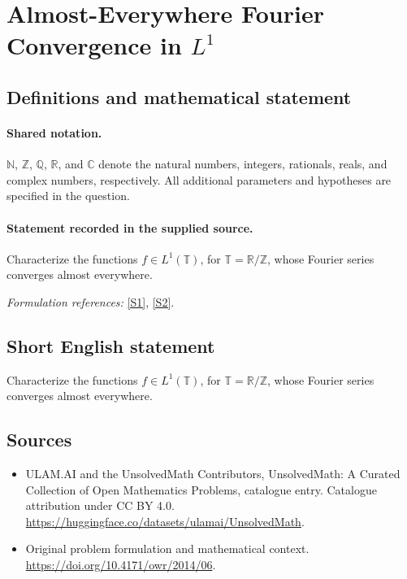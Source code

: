 \documentclass[11pt]{article}
\newcommand{\sref}[2]{\hyperlink{source:#1:#2}{[S#2]}}
\begin{document}
\section{\texorpdfstring{Almost-Everywhere Fourier Convergence in $L^{1}$}{Almost-Everywhere Fourier Convergence in L\textasciicircum{}1}}\label{statement}

\subsection{Definitions and mathematical statement}

\paragraph{Shared notation.}$\mathbb N$, $\mathbb Z$, $\mathbb Q$, $\mathbb R$, and $\mathbb C$ denote the natural numbers, integers, rationals, reals, and complex numbers, respectively. All additional parameters and hypotheses are specified in the question.


\paragraph{Statement recorded in the supplied source.}
Characterize the functions $f\in L^1(\mathbb T)$, for $\mathbb T=\mathbb R/\mathbb Z$, whose Fourier series converges almost everywhere.
\par\smallskip\textit{Formulation references:} \sref{statement}{1}, \sref{statement}{2}.
\subsection{Short English statement}
Characterize the functions $f\in L^1(\mathbb T)$, for $\mathbb T=\mathbb R/\mathbb Z$, whose Fourier series converges almost everywhere.
\subsection{Sources}
\begin{itemize}
\item[\hypertarget{source:statement:1}{S1}] ULAM.AI and the UnsolvedMath Contributors, UnsolvedMath: A Curated Collection of Open Mathematics Problems, catalogue entry. Catalogue attribution under CC BY 4.0.
\url{https://huggingface.co/datasets/ulamai/UnsolvedMath}.
\item[\hypertarget{source:statement:2}{S2}] Original problem formulation and mathematical context.
\url{https://doi.org/10.4171/owr/2014/06}.
\end{itemize}
\label{end:statement}
\end{document}
